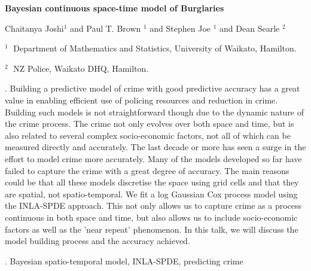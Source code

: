 \documentclass[12pt]{article}
\begin{document}
\begin{flushleft}


{\LARGE\bf Bayesian continuous space-time model of Burglaries}


\vspace{1.0cm}

Chaitanya Joshi$^1$ and Paul T. Brown $^1$ and Stephen Joe $^1$ and Dean Searle $^2$

\begin{description}

\item $^1 \;$ Department of Mathematics and Statistics, University of Waikato, Hamilton.

\item $^2 \;$ NZ Police, Waikato DHQ, Hamilton.

\end{description}

\end{flushleft}


\vspace{0.75cm}

. Building a predictive model of crime with good predictive accuracy has a great value in enabling efficient use of policing resources and reduction in crime. Building such models is not straightforward though due to the dynamic nature of the crime process. The crime not only evolves over both space and time, but is also related to several complex socio-economic factors, not all of which can be measured directly and accurately. The last decade or more has seen a surge in the effort to model crime more accurately. Many of the models developed so far have failed to capture the crime with a great degree of accuracy. The main reasons could be that all these models discretise the space using grid cells and that they are spatial, not spatio-temporal.
We fit a log Gaussian Cox process model using the INLA-SPDE approach. This not only allows us to capture crime as a process continuous in both space and time, but also allows us to include socio-economic factors as well as the 'near repeat' phenomenon. In this talk, we will discuss the model building process and the accuracy achieved.

\vskip 2mm

.
Bayesian spatio-temporal model, INLA-SPDE, predicting crime
\end{document}
